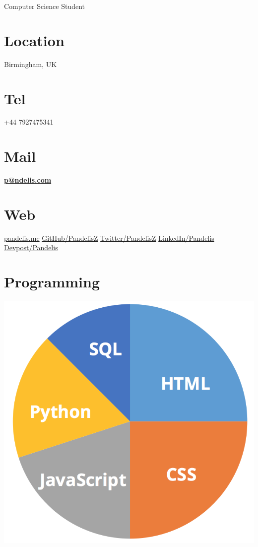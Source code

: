 \documentclass[]{friggeri-cv}
\begin{document}
      {Computer Science Student}
      

\begin{aside}
  \section{Location}
    Birmingham, UK
    ~
  \section{Tel}
    +44 7927475341
    ~
  \section{Mail}
    \href{mailto:p@ndelis.com}{\textbf{p@ndelis.com}}
    ~
  \section{Web}
    \href{http://pandelis.me}{pandelis.me}
    \href{https://github.com/pandelisz}{GitHub/PandelisZ}
    \href{https://twitter.com/pandelisz}{Twitter/PandelisZ}
    \href{https://linkedin.com/in/pandelis}{LinkedIn/Pandelis}
    \href{https://devpost.com/pandelis}{Devpost/Pandelis}
    ~
  \section{Programming}
    \includegraphics[scale=0.30]{img/programming.png}
    ~

\end{aside}
\end{document}
